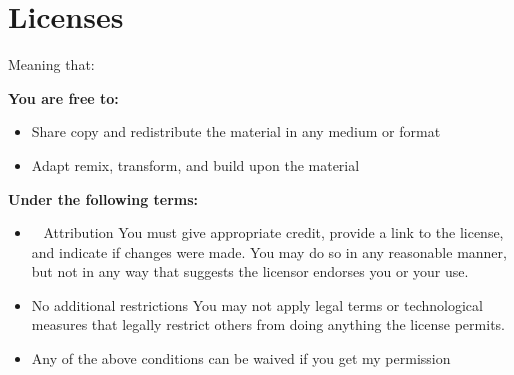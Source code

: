 
\pagestyle{empty}
\chapter*{Licenses}

Meaning that:

\textbf{You are free to:}
\begin{itemize}
\item Share \textemdash copy and redistribute the material in any medium or format
\item Adapt \textemdash remix, transform, and build upon the material
\end{itemize}

\textbf{Under the following terms:}
\begin{itemize}
\item \ccAttribution~ Attribution \textemdash You must give appropriate credit, provide a link to the license, and indicate if changes were made. You may do so in any reasonable manner, but not in any way that suggests the licensor endorses you or your use.
\item No additional restrictions \textemdash You may not apply legal terms or technological measures that legally restrict others from doing anything the license permits.
\item Any of the above conditions can be waived if you get my permission
\end{itemize}


\clearpage
